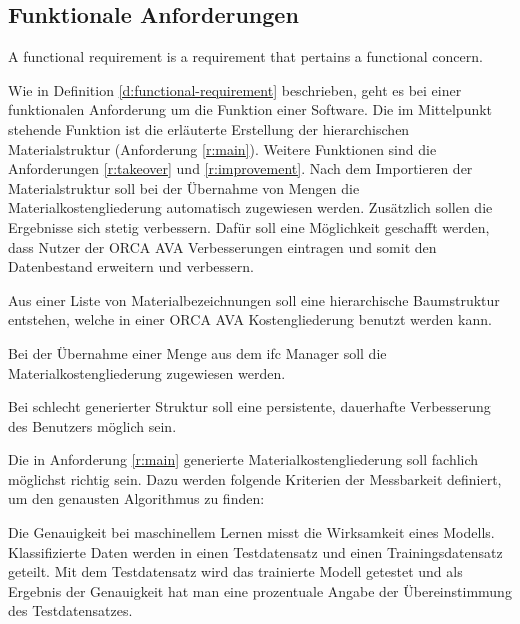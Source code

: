 \subsection{Funktionale Anforderungen}
\label{c:requirements:requirements:functional}

\begin{definition}
	\label{d:functional-requirement}
	\glqq A functional requirement is a requirement	that pertains a functional concern.\grqq{}\citep{glinz_2007}
\end{definition}

Wie in Definition \ref{d:functional-requirement} beschrieben, geht es bei einer funktionalen Anforderung um die Funktion einer Software. Die im Mittelpunkt stehende Funktion ist die erläuterte Erstellung der hierarchischen Materialstruktur (Anforderung \ref{r:main}). Weitere Funktionen sind die Anforderungen \ref{r:takeover} und \ref{r:improvement}. Nach dem Importieren der Materialstruktur soll bei der Übernahme von Mengen die Materialkostengliederung automatisch zugewiesen werden. Zusätzlich sollen die Ergebnisse sich stetig verbessern. Dafür soll eine Möglichkeit geschafft werden, dass Nutzer der ORCA AVA Verbesserungen eintragen und somit den Datenbestand erweitern und verbessern.

\begin{requirement}
	\label{r:main}
	Aus einer Liste von Materialbezeichnungen soll eine hierarchische Baumstruktur entstehen, welche in einer ORCA AVA Kostengliederung benutzt werden kann.
\end{requirement}

\begin{requirement}
	\label{r:takeover}
	Bei der Übernahme einer Menge aus dem \ac{ifc} Manager soll die Materialkostengliederung zugewiesen werden.
\end{requirement}

\begin{requirement}
	\label{r:improvement}
	Bei schlecht generierter Struktur soll eine persistente, dauerhafte Verbesserung des Benutzers möglich sein.
\end{requirement}

Die in Anforderung \ref{r:main} generierte Materialkostengliederung soll fachlich möglichst richtig sein. Dazu werden folgende Kriterien der Messbarkeit definiert, um den genausten Algorithmus zu finden:

Die Genauigkeit bei maschinellem Lernen misst die Wirksamkeit eines Modells. Klassifizierte Daten werden in einen Testdatensatz und einen Trainingsdatensatz geteilt. Mit dem Testdatensatz wird das trainierte Modell getestet und als Ergebnis der Genauigkeit hat man eine prozentuale Angabe der Übereinstimmung des Testdatensatzes. \citep{Microsoft_2022_ml}

